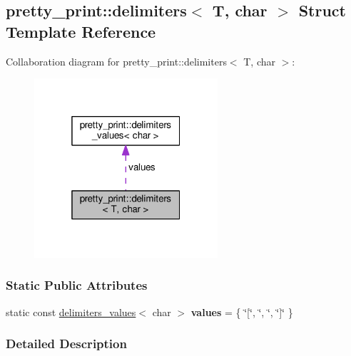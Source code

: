 \hypertarget{structpretty__print_1_1delimiters_3_01T_00_01char_01_4}{}\subsection{pretty\+\_\+print\+:\+:delimiters$<$ T, char $>$ Struct Template Reference}
\label{structpretty__print_1_1delimiters_3_01T_00_01char_01_4}


Collaboration diagram for pretty\+\_\+print\+:\+:delimiters$<$ T, char $>$\+:\nopagebreak
\begin{figure}[H]
\begin{center}
\leavevmode
\includegraphics[width=193pt]{structpretty__print_1_1delimiters_3_01T_00_01char_01_4__coll__graph}
\end{center}
\end{figure}
\subsubsection*{Static Public Attributes}
\begin{DoxyCompactItemize}
\item 
static const \hyperlink{structpretty__print_1_1delimiters__values}{delimiters\+\_\+values}$<$ char $>$ {\bfseries values} = \{ \char`\"{}\mbox{[}\char`\"{}, \char`\"{}, \char`\"{}, \char`\"{}\mbox{]}\char`\"{} \}\hypertarget{structpretty__print_1_1delimiters_3_01T_00_01char_01_4_ac5681913d85aa5a660e0ee0d0e556dc7}{}\label{structpretty__print_1_1delimiters_3_01T_00_01char_01_4_ac5681913d85aa5a660e0ee0d0e556dc7}

\end{DoxyCompactItemize}


\subsubsection{Detailed Description}
